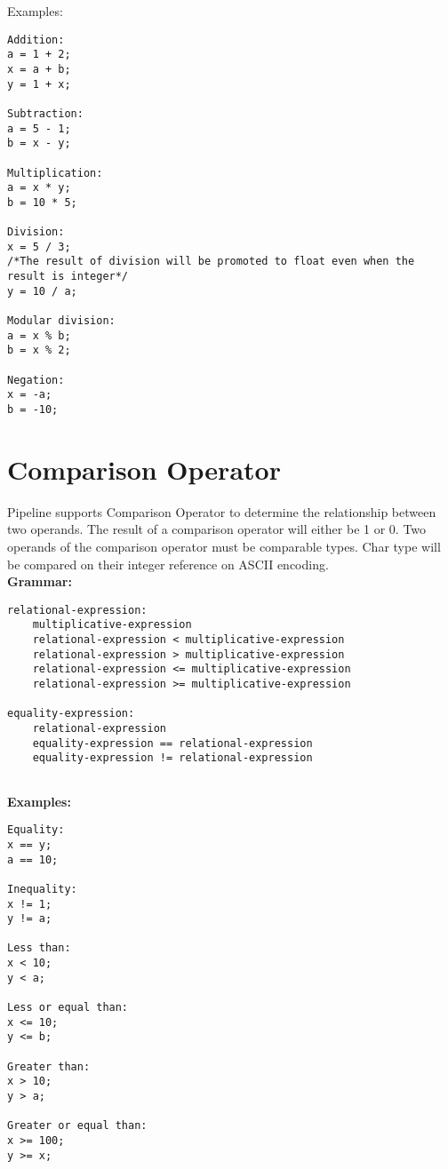\documentclass[./LRM_main.tex]{subfiles}
\begin{document}
Examples:
\begin{lstlisting}
Addition:
a = 1 + 2;
x = a + b;
y = 1 + x;

Subtraction:
a = 5 - 1;
b = x - y;

Multiplication:
a = x * y;
b = 10 * 5;

Division:
x = 5 / 3; 
/*The result of division will be promoted to float even when the result is integer*/
y = 10 / a;

Modular division:
a = x % b;
b = x % 2;

Negation:
x = -a;
b = -10;
\end{lstlisting}
\section{Comparison Operator}
Pipeline supports Comparison Operator to determine the relationship between two operands. The result of a comparison operator will either be 1 or 0. Two operands of the comparison operator must be comparable types. Char type will be compared on their integer reference on ASCII encoding.\\
\vspace{1 mm}
\textbf{Grammar:}
\begin{lstlisting}
relational-expression:
    multiplicative-expression
    relational-expression < multiplicative-expression
    relational-expression > multiplicative-expression
    relational-expression <= multiplicative-expression
    relational-expression >= multiplicative-expression

equality-expression:
    relational-expression
    equality-expression == relational-expression
    equality-expression != relational-expression
    
\end{lstlisting}
\vspace{1 mm}
\textbf{Examples:}
\begin{lstlisting}
Equality:
x == y;
a == 10;

Inequality:
x != 1;
y != a;

Less than:
x < 10;
y < a;

Less or equal than:
x <= 10;
y <= b;

Greater than:
x > 10;
y > a;

Greater or equal than:
x >= 100;
y >= x;

\end{lstlisting}
\end{document}
